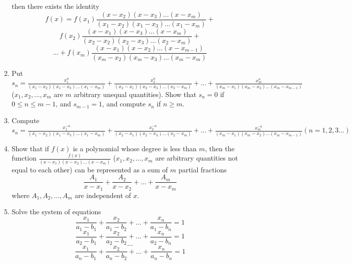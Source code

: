 \begin{enumerate}[resume]
  then there exists the identity
  $$f(x) = f(x_1)\frac{(x - x_2)(x - x_3)\ldots(x - x_m)}{(x_1 - x_2)(x_1 - x_3)\ldots(x_1 - x_m)} +$$
  $$f(x_2)\frac{(x - x_1)(x - x_3)\ldots(x - x_m)}{(x_2 - x_2)(x_2 - x_3)\ldots(x_2 - x_m)} + $$
  $$\ldots + f(x_m)\frac{(x - x_1)(x - x_2)\ldots(x - x_{m - 1})}{(x_m - x_2)(x_m - x_3)\ldots(x_m - x_m)}$$
\item Put $s_n = \frac{x_1^n}{(x_1 - x_2)(x_1 - x_3)\ldots(x_1 - x_m)} + \frac{x_2^n}{(x_2 - x_1)(x_2 - x_3)\ldots(x_2 - x_m)} +
  \ldots + \frac{x_m^n}{(x_m - x_1)(x_m - x_2)\ldots(x_m - x_{m - 1})}$ ($x_1, x_2, \ldots, x_m$ are $m$ arbitrary unequal
  quantities). Show that $s_n = 0$ if $0\leq n\leq m - 1$, and $s_{m - 1} = 1$, and compute $s_n$ if $n\geq m$.
\item Compute $s_n = \frac{x_1^{-n}}{(x_1 - x_2)(x_1 - x_3)\ldots(x_1 - x_m)} + \frac{x_2^{-n}}{(x_2 - x_1)(x_2 - x_3)\ldots(x_2 -
  x_m)} + \ldots + \frac{x_m^{-n}}{(x_m - x_1)(x_m - x_2)\ldots(x_m - x_{m - 1})} (n = 1, 2, 3\ldots)$
\item Show that if $f(x)$ is a polynomial whose degree is less than $m$, then the function $\frac{f(x)}{(x - x_1)(x - x_2)\ldots(x
  - x_m)}$ ($x_1, x_2, \ldots, x_m$ are arbitrary quantities not equal to each other) can be represented as a sum of $m$ partial
  fractions
  $$\frac{A_1}{x - x_1} + \frac{A_2}{x - x_2} + \ldots + \frac{A_m}{x - x_m}$$
  where $A_1, A_2, \ldots, A_m$ are independent of $x$.
\item Solve the system of equations
  $$\frac{x_1}{a_1 - b_1} + \frac{x_2}{a_1 - b_2} + \ldots + \frac{x_n}{a_1 - b_n} = 1$$
  $$\frac{x_1}{a_2 - b_1} + \frac{x_2}{a_2 - b_2} + \ldots + \frac{x_n}{a_2 - b_n} = 1$$
  $$\ldots$$
  $$\frac{x_1}{a_n - b_1} + \frac{x_2}{a_n - b_2} + \ldots + \frac{x_n}{a_n - b_n} = 1$$
\end{enumerate}

